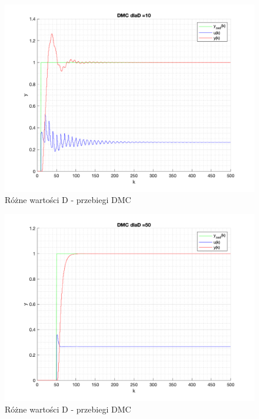 \documentclass[a4paper, 11pt]{article}
\begin{document}
\begin{enumerate}
\begin{figure} [H]
\centering
 \includegraphics[width=\linewidth]{./ModelsP4_D/P4_DMC_D_10_png.png} 
 \caption[Różne wartości D - przebiegi DMC]
{Różne wartości D - przebiegi DMC}
 \end{figure}
 
 \begin{figure} [h]
\centering
 \includegraphics[width=\linewidth]{./ModelsP4_D/P4_DMC_D_50_png.png} 
 \caption[Różne wartości D - przebiegi DMC]
{Różne wartości D - przebiegi DMC}
 \end{figure}
 

\end{enumerate}
\end{document}
